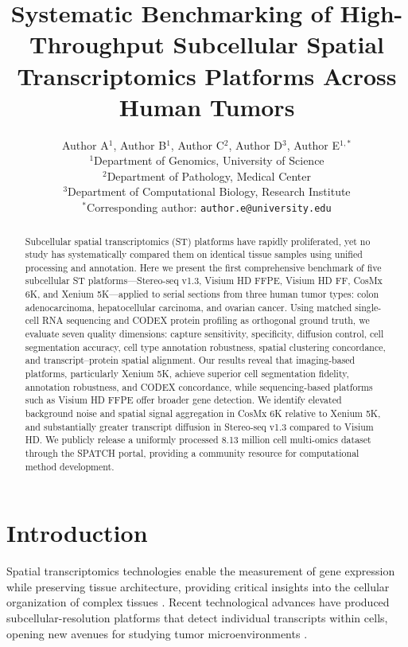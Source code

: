 \documentclass[11pt]{article}
\title{Systematic Benchmarking of High-Throughput Subcellular Spatial Transcriptomics Platforms Across Human Tumors}
\author{%
  Author A$^{1}$, Author B$^{1}$, Author C$^{2}$, Author D$^{3}$, Author E$^{1,*}$\\[6pt]
  $^{1}$Department of Genomics, University of Science\\
  $^{2}$Department of Pathology, Medical Center\\
  $^{3}$Department of Computational Biology, Research Institute\\[4pt]
  $^{*}$Corresponding author: \texttt{author.e@university.edu}
}
\date{}
\begin{document}
\maketitle

\begin{abstract}
Subcellular spatial transcriptomics (ST) platforms have rapidly proliferated, yet no study has systematically compared them on identical tissue samples using unified processing and annotation. Here we present the first comprehensive benchmark of five subcellular ST platforms---Stereo-seq v1.3, Visium HD FFPE, Visium HD FF, CosMx 6K, and Xenium 5K---applied to serial sections from three human tumor types: colon adenocarcinoma, hepatocellular carcinoma, and ovarian cancer. Using matched single-cell RNA sequencing and CODEX protein profiling as orthogonal ground truth, we evaluate seven quality dimensions: capture sensitivity, specificity, diffusion control, cell segmentation accuracy, cell type annotation robustness, spatial clustering concordance, and transcript--protein spatial alignment. Our results reveal that imaging-based platforms, particularly Xenium 5K, achieve superior cell segmentation fidelity, annotation robustness, and CODEX concordance, while sequencing-based platforms such as Visium HD FFPE offer broader gene detection. We identify elevated background noise and spatial signal aggregation in CosMx 6K relative to Xenium 5K, and substantially greater transcript diffusion in Stereo-seq v1.3 compared to Visium HD. We publicly release a uniformly processed 8.13 million cell multi-omics dataset through the SPATCH portal, providing a community resource for computational method development.
\end{abstract}

\section{Introduction}

Spatial transcriptomics technologies enable the measurement of gene expression while preserving tissue architecture, providing critical insights into the cellular organization of complex tissues \citep{moses2022museum, rao2021exploring}. Recent technological advances have produced subcellular-resolution platforms that detect individual transcripts within cells, opening new avenues for studying tumor microenvironments \citep{williams2022introduction, moffitt2022emerging}.
\end{document}
